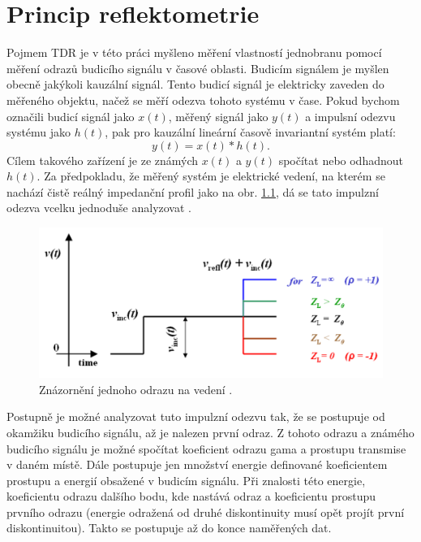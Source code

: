 \chapter{Princip reflektometrie}

Pojmem \acrfull{TDR} je v této práci myšleno měření vlastností jednobranu pomocí měření odrazů budicího signálu v časové oblasti. Budicím signálem je myšlen obecně jakýkoli kauzální signál. Tento budicí signál je elektricky zaveden do měřeného objektu, načež se měří odezva tohoto systému v čase.
Pokud bychom označili budicí signál jako $x(t)$, měřený signál jako $y(t)$ a impulsní odezvu systému jako $h(t)$, pak pro kauzální lineární časově invariantní systém platí:
\begin{equation}
y(t)=x(t) \ast h(t).
\end{equation}
Cílem takového zařízení je ze známých $x(t)$ a $y(t)$ spočítat nebo odhadnout $h(t)$. Za předpokladu, že měřený systém je elektrické vedení, na kterém se nachází čistě reálný impedanční profil jako na obr. \ref{simpleresponse}, dá se tato impulzní odezva vcelku jednoduše analyzovat \cite{broadbandreflectometry}.

\begin{figure}[htbp]\includegraphics[width=\textwidth,keepaspectratio]{images/onereflectionsample.png}\caption{Znázornění jednoho odrazu na vedení \cite{broadbandreflectometry}.}\label{simpleresponse}\end{figure}

Postupně je možné analyzovat tuto impulzní odezvu tak, že se postupuje od okamžiku budicího signálu, až je nalezen první odraz. Z tohoto odrazu a známého budicího signálu je možné spočítat koeficient odrazu \gls{gama} a prostupu \gls{transmise} v daném místě. Dále postupuje jen množství energie definované koeficientem prostupu a energií obsažené v budicím signálu. Při znalosti této energie, koeficientu odrazu dalšího bodu, kde nastává odraz a koeficientu prostupu prvního odrazu (energie odražená od druhé diskontinuity musí opět projít první diskontinuitou). Takto se postupuje až do konce naměřených dat.

